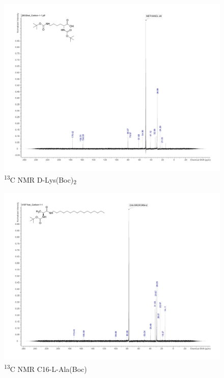 \begin{figure}[ht!]
\centering
\includegraphics[scale=0.47]{13CNMR/KAT1_5_13C.pdf}
\caption{\textsuperscript{13}C NMR D-Lys(Boc)\textsubscript{2}}
\label{KAT1.5_13C}
\end{figure}

\begin{figure}[ht!]
\centering
\includegraphics[scale=0.47]{13CNMR/KAT1_23_13C.pdf}
\caption{\textsuperscript{13}C NMR C16-L-Ala(Boc)}
\label{KAT1.23_13C}
\end{figure}